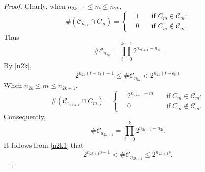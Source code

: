 \documentclass[10pt,a4paper]{amsart}
\begin{document}
\begin{proof}
		Clearly, when $n_{2k-1}\leq m\leq n_{2k}$,
		\begin{equation*}
			\#(\mathcal{C}_{n_{2k}}\cap C_{m})=\left\{
			\begin{aligned}
				&1 \quad&\text{if } C_{m}\in\mathcal{C}_{m};\\
				&0 \quad&\text{if } C_{m}\notin\mathcal{C}_{m}.
			\end{aligned}\right.
		\end{equation*}
		Thus 
		\begin{equation*}
			\#\mathcal{C}_{n_{2k}}=\prod_{i=0}^{k-1}2^{n_{2i+1}-n_{2i}}.
		\end{equation*}
		By \eqref{n2k}, 
		\begin{equation}\label{2k}
			2^{n_{2k}(t-\epsilon_k)-1}\leq\#\mathcal{C}_{n_{2k}}<2^{n_{2k}(t-\epsilon_k)}
		\end{equation}
		When $n_{2k}\leq m\leq n_{2k+1}$,
		\begin{equation*}
			\#(\mathcal{C}_{n_{2k+1}}\cap C_{m})=\left\{ 
			\begin{aligned}
				&2^{n_{2k+1}-m} \quad&\text{if } C_{m}\in\mathcal{C}_{m};\\
				&0 \quad&\text{if } C_{m}\notin\mathcal{C}_{m}.
			\end{aligned}\right.
		\end{equation*}
		Consequently,
		\begin{equation*}
			\#\mathcal{C}_{n_{2k+1}}=\prod_{i=0}^{k}2^{n_{2i+1}-n_{2i}}.
		\end{equation*}
		It follows from \eqref{n2k1} that
		\begin{equation}\label{2k+1}
			2^{n_{2k+1}s-1}<\#\mathcal{C}_{n_{2k+1}}\leq2^{n_{2k+1}s}.
		\end{equation}
		

\end{proof}
\end{document}
